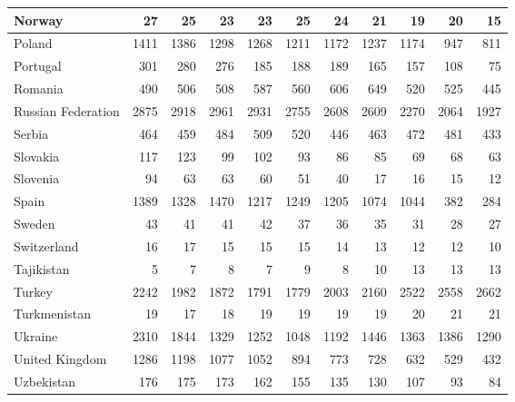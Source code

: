 \begin{table}
\begin{tabular}{|l|r|r|r|r|r|r|r|r|r|r|}
                        Norway&     27&     25&     23&     23&     25&     24&     21&     19&     20&     15\\\hline
                        Poland&   1411&   1386&   1298&   1268&   1211&   1172&   1237&   1174&    947&    811\\\hline
                      Portugal&    301&    280&    276&    185&    188&    189&    165&    157&    108&     75\\\hline
                       Romania&    490&    506&    508&    587&    560&    606&    649&    520&    525&    445\\\hline
            Russian Federation&   2875&   2918&   2961&   2931&   2755&   2608&   2609&   2270&   2064&   1927\\\hline
                        Serbia&    464&    459&    484&    509&    520&    446&    463&    472&    481&    433\\\hline
                      Slovakia&    117&    123&     99&    102&     93&     86&     85&     69&     68&     63\\\hline
                      Slovenia&     94&     63&     63&     60&     51&     40&     17&     16&     15&     12\\\hline
                         Spain&   1389&   1328&   1470&   1217&   1249&   1205&   1074&   1044&    382&    284\\\hline
                        Sweden&     43&     41&     41&     42&     37&     36&     35&     31&     28&     27\\\hline
                   Switzerland&     16&     17&     15&     15&     15&     14&     13&     12&     12&     10\\\hline
                    Tajikistan&      5&      7&      8&      7&      9&      8&     10&     13&     13&     13\\\hline
                        Turkey&   2242&   1982&   1872&   1791&   1779&   2003&   2160&   2522&   2558&   2662\\\hline
                  Turkmenistan&     19&     17&     18&     19&     19&     19&     19&     20&     21&     21\\\hline
                       Ukraine&   2310&   1844&   1329&   1252&   1048&   1192&   1446&   1363&   1386&   1290\\\hline
                United Kingdom&   1286&   1198&   1077&   1052&    894&    773&    728&    632&    529&    432\\\hline
                    Uzbekistan&    176&    175&    173&    162&    155&    135&    130&    107&     93&     84\\\hline

\end{tabular}
\end{table}
